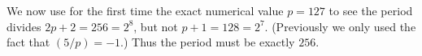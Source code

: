 \begin{dproblem}[HMMT 2017]
\begin{sol}
	We now use for the first time the exact numerical value $p=127$
	to see the period divides $2p+2 = 256 = 2^8$,
	but not $p+1 = 128 = 2^7$.
	(Previously we only used the fact that $(5/p)=-1$.)
	Thus the period must be exactly $256$.
	\end{sol}
\end{dproblem}
